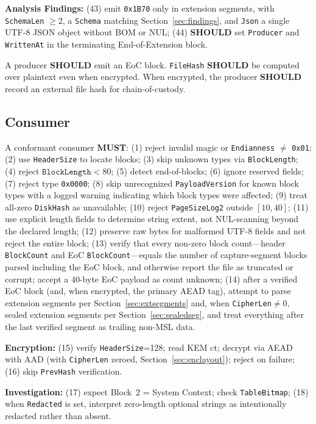 \documentclass[11pt,a4paper]{article}
\newcommand{\MUST}{\textbf{MUST}}
\newcommand{\SHOULD}{\textbf{SHOULD}}
\newcommand{\hex}[1]{\texttt{0x#1}}
\newcommand{\field}[1]{\texttt{#1}}
\begin{document}
\noindent\textbf{Analysis Findings:} (43) emit \hex{1B70} only in extension segments, with \field{SchemaLen} $\geq 2$, a \field{Schema} matching Section~\ref{sec:findings}, and \field{Json} a single UTF-8 JSON object without BOM or NUL; (44) \SHOULD{} set \field{Producer} and \field{WrittenAt} in the terminating End-of-Extension block.

\noindent A producer \SHOULD{} emit an EoC block. \field{FileHash} \SHOULD{} be computed over plaintext even when encrypted. When encrypted, the producer \SHOULD{} record an external file hash for chain-of-custody.

\subsection{Consumer}
A conformant consumer \MUST: (1) reject invalid magic or \field{Endianness} $\neq$ \hex{01}; (2) use \field{HeaderSize} to locate blocks; (3) skip unknown types via \field{BlockLength}; (4) reject $\field{BlockLength} < 80$; (5) detect end-of-blocks; (6) ignore reserved fields; (7) reject type \hex{0000}; (8) skip unrecognized \field{PayloadVersion} for known block types with a logged warning indicating which block types were affected; (9) treat all-zero \field{DiskHash} as unavailable; (10) reject \field{PageSizeLog2} outside $[10,40]$; (11) use explicit length fields to determine string extent, not NUL-scanning beyond the declared length; (12) preserve raw bytes for malformed UTF-8 fields and not reject the entire block; (13) verify that every non-zero block count---header \field{BlockCount} and EoC \field{BlockCount}---equals the number of capture-segment blocks parsed including the EoC block, and otherwise report the file as truncated or corrupt; accept a 40-byte EoC payload as count unknown; (14) after a verified EoC block (and, when encrypted, the primary AEAD tag), attempt to parse extension segments per Section~\ref{sec:extsegments} and, when \field{CipherLen}$\neq$0, sealed extension segments per Section~\ref{sec:sealedseg}, and treat everything after the last verified segment as trailing non-MSL data.

\noindent\textbf{Encryption:} (15) verify \field{HeaderSize}=128; read KEM ct; decrypt via AEAD with AAD (with \field{CipherLen} zeroed, Section~\ref{sec:enclayout}); reject on failure; (16) skip \field{PrevHash} verification.

\noindent\textbf{Investigation:} (17) expect Block~2 = System Context; check \field{TableBitmap}; (18) when \field{Redacted} is set, interpret zero-length optional strings as intentionally redacted rather than absent.
\end{document}
